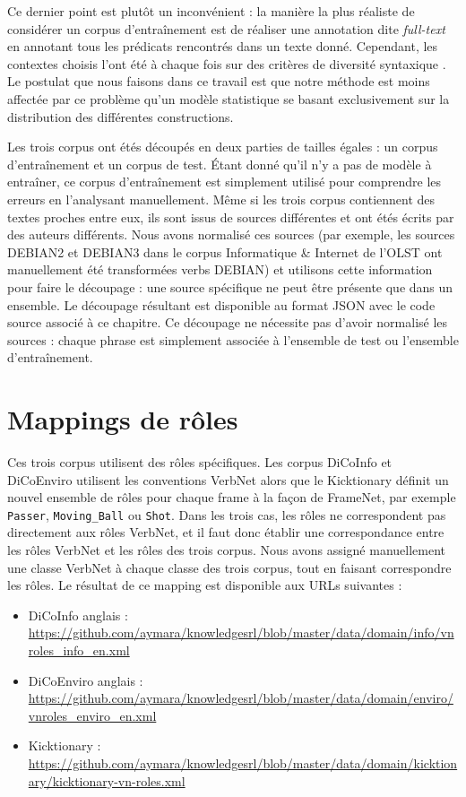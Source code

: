 Ce dernier point est plutôt un inconvénient : la manière la plus réaliste de
considérer un corpus d'entraînement est de réaliser une annotation dite
\textit{full-text} en annotant tous les prédicats rencontrés dans un texte
donné. Cependant, les contextes choisis l'ont été à chaque fois sur des
critères de diversité syntaxique
\citep{schmidt2006interfacing,lhomme2012adding}. Le postulat que nous faisons
dans ce travail est que notre méthode est moins affectée par ce problème qu'un
modèle statistique se basant exclusivement sur la distribution des différentes
constructions.

Les trois corpus ont étés découpés en deux parties de tailles égales : un
corpus d'entraînement et un corpus de test. Étant donné qu'il n'y a pas de
modèle à entraîner, ce corpus d'entraînement est simplement utilisé pour
comprendre les erreurs en l'analysant manuellement. Même si les trois corpus
contiennent des textes proches entre eux, ils sont issus de sources différentes
et ont étés écrits par des auteurs différents. Nous avons normalisé ces sources
(par exemple, les sources DEBIAN2 et DEBIAN3 dans le corpus Informatique \&
Internet de l'OLST ont manuellement été transformées verbs DEBIAN) et utilisons
cette information pour faire le découpage : une source spécifique ne peut être
présente que dans un ensemble. Le découpage résultant est disponible au format
JSON avec le code source associé à ce chapitre. Ce découpage ne nécessite pas
d'avoir normalisé les sources : chaque phrase est simplement associée à
l'ensemble de test ou l'ensemble d'entraînement.

\section{Mappings de rôles}

Ces trois corpus utilisent des rôles spécifiques. Les corpus DiCoInfo et
DiCoEnviro utilisent les conventions VerbNet alors que le Kicktionary  définit
un nouvel ensemble de rôles pour chaque frame à la façon de FrameNet, par
exemple \texttt{Passer}, \texttt{Moving\_Ball} ou \texttt{Shot}. Dans les trois
cas, les rôles ne correspondent pas directement aux rôles VerbNet, et il faut
donc établir une correspondance entre les rôles VerbNet et les rôles des trois
corpus.  Nous avons assigné manuellement une classe VerbNet à chaque classe des
trois corpus, tout en faisant correspondre les rôles. Le résultat de ce mapping
est disponible aux URLs suivantes :

\begin{itemize}
    \item DiCoInfo anglais : \url{https://github.com/aymara/knowledgesrl/blob/master/data/domain/info/vnroles_info_en.xml}
    \item DiCoEnviro anglais : \url{https://github.com/aymara/knowledgesrl/blob/master/data/domain/enviro/vnroles_enviro_en.xml}
    \item Kicktionary : \url{https://github.com/aymara/knowledgesrl/blob/master/data/domain/kicktionary/kicktionary-vn-roles.xml}
\end{itemize}

